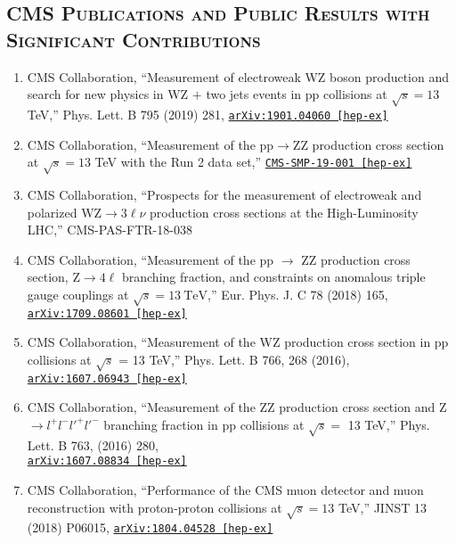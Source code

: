 \documentclass[10pt]{res} %
\begin{document}
\begin{resume}
\section{\textsc{CMS Publications and Public Results with Significant Contributions}}
\begin{enumerate}
  \item CMS Collaboration, ``Measurement of electroweak WZ boson production and search for new physics in WZ $+$ two jets events in pp collisions at $\sqrt{s}=13$\,TeV,'' Phys. Lett. B 795 (2019) 281, \href{https://arxiv.org/abs/1901.04060} {\texttt{arXiv:1901.04060 [hep-ex]}}
  \item CMS Collaboration, ``Measurement of the pp$\to$ZZ production cross section at $\sqrt{s}=13$ TeV with the Run 2 data set,'' \href{http://cms-results.web.cern.ch/cms-results/public-results/preliminary-results/SMP-19-001/index.html} {\texttt{CMS-SMP-19-001 [hep-ex]}}
  \item CMS Collaboration, ``Prospects for the measurement of electroweak and polarized $\mathrm{WZ}\to3\ell\nu$ production cross sections at the High-Luminosity LHC,'' CMS-PAS-FTR-18-038
  \item CMS Collaboration, ``Measurement of the pp $\rightarrow$ ZZ production cross section, $\mathrm{Z} \to 4\ell$ branching fraction, and constraints on anomalous triple gauge couplings at $\sqrt{s} = 13~\mathrm{TeV}$,'' Eur. Phys. J. C 78 (2018) 165, \href{https://arxiv.org/abs/1709.08601}{\texttt{arXiv:1709.08601 [hep-ex]}}
  \item CMS Collaboration, ``Measurement of the WZ production cross section in pp collisions at $\sqrt{s}$ = 13 TeV,''
Phys. Lett. B 766, 268 (2016), \href{https://arxiv.org/abs/1607.06943}{\texttt{arXiv:1607.06943 [hep-ex]}}
  \item CMS Collaboration, ``Measurement of the ZZ production cross section and Z $\rightarrow l^{+}l^{-}l'^{+}l'^{-}$ branching fraction in pp collisions at $\sqrt{s} =$ 13 TeV,''
Phys. Lett. B 763, (2016) 280, \\ \href{https://arxiv.org/abs/1607.08834} {\texttt{arXiv:1607.08834 [hep-ex]}}
  \item CMS Collaboration, ``Performance of the CMS muon detector and muon reconstruction with proton-proton collisions at $\sqrt{s} = 13$ TeV,''
JINST 13 (2018) P06015, \href{https://arxiv.org/abs/1804.04528} {\texttt{arXiv:1804.04528 [hep-ex]}}
\end{enumerate}


\end{resume}
\end{document}
